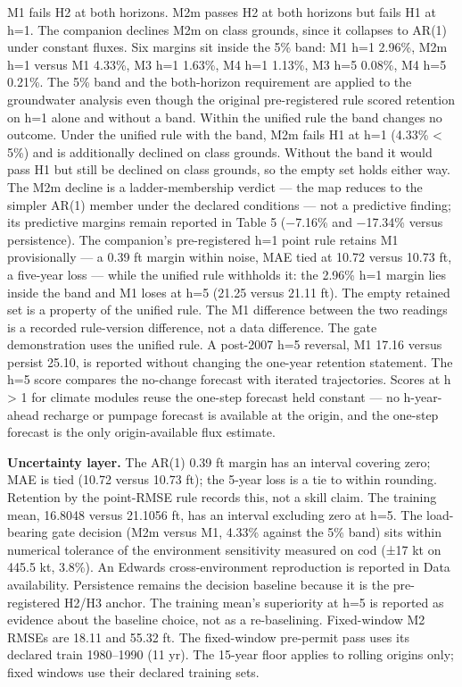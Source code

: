 \documentclass[11pt]{article}
\begin{document}
M1 fails H2 at both horizons. M2m passes H2 at both horizons but fails
H1 at h=1. The companion declines M2m on class grounds, since it
collapses to AR(1) under constant fluxes. Six margins sit inside the 5\%
band: M1 h=1 2.96\%, M2m h=1 versus M1 4.33\%, M3 h=1 1.63\%, M4 h=1
1.13\%, M3 h=5 0.08\%, M4 h=5 0.21\%. The 5\% band and the both-horizon
requirement are applied to the groundwater analysis even though the
original pre-registered rule scored retention on h=1 alone and without a
band. Within the unified rule the band changes no outcome. Under the
unified rule with the band, M2m fails H1 at h=1 (4.33\% \textless{} 5\%)
and is additionally declined on class grounds. Without the band it would
pass H1 but still be declined on class grounds, so the empty set holds
either way. The M2m decline is a ladder-membership verdict --- the map
reduces to the simpler AR(1) member under the declared conditions ---
not a predictive finding; its predictive margins remain reported in
Table 5 (−7.16\% and −17.34\% versus persistence). The companion's
pre-registered h=1 point rule retains M1 provisionally --- a 0.39 ft
margin within noise, MAE tied at 10.72 versus 10.73 ft, a five-year loss
--- while the unified rule withholds it: the 2.96\% h=1 margin lies
inside the band and M1 loses at h=5 (21.25 versus 21.11 ft). The empty
retained set is a property of the unified rule. The M1 difference
between the two readings is a recorded rule-version difference, not a
data difference. The gate demonstration uses the unified rule. A
post-2007 h=5 reversal, M1 17.16 versus persist 25.10, is reported
without changing the one-year retention statement. The h=5 score
compares the no-change forecast with iterated trajectories. Scores at h
\textgreater{} 1 for climate modules reuse the one-step forecast held
constant --- no h-year-ahead recharge or pumpage forecast is available
at the origin, and the one-step forecast is the only origin-available
flux estimate.

\textbf{Uncertainty layer.} The AR(1) 0.39 ft margin has an interval
covering zero; MAE is tied (10.72 versus 10.73 ft); the 5-year loss is a
tie to within rounding. Retention by the point-RMSE rule records this,
not a skill claim. The training mean, 16.8048 versus 21.1056 ft, has an
interval excluding zero at h=5. The load-bearing gate decision (M2m
versus M1, 4.33\% against the 5\% band) sits within numerical tolerance
of the environment sensitivity measured on cod (±17 kt on 445.5 kt,
3.8\%). An Edwards cross-environment reproduction is reported in Data
availability. Persistence remains the decision baseline because it is
the pre-registered H2/H3 anchor. The training mean's superiority at h=5
is reported as evidence about the baseline choice, not as a
re-baselining. Fixed-window M2 RMSEs are 18.11 and 55.32 ft. The
fixed-window pre-permit pass uses its declared train 1980--1990 (11 yr).
The 15-year floor applies to rolling origins only; fixed windows use
their declared training sets.
\end{document}
